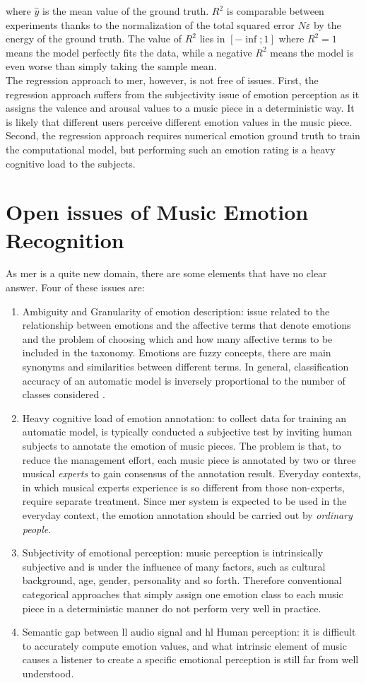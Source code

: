 where $\widehat{y}$ is the mean value of the ground truth. $R^2$ is comparable between experiments thanks to the normalization of the total squared error $N\varepsilon$ by the energy of the ground truth. The value of $R^2$  lies in $[-\inf;1]$ where $R^2=1$ means the model perfectly fits the data, while a negative $R^2$ means the model is even worse than simply taking the sample mean.
\\ \indent
The regression approach to \gls{mer}, however, is not free of issues. First, the regression approach suffers from the subjectivity issue of emotion perception as it assigns the valence and arousal values to a music piece in a deterministic way. It is likely that different users perceive different emotion values in the music piece. Second, the regression approach requires numerical emotion ground truth to train the computational model, but performing such an emotion rating is a heavy cognitive load to the subjects.

\newpage
\section{Open issues of Music Emotion Recognition} \label{issues}
As \gls{mer}  is a quite new domain, there are some elements that have no clear answer. Four of these issues are:
\begin{enumerate}
	\item Ambiguity and Granularity of emotion description: issue related to the relationship between emotions and the affective terms that denote emotions and the problem of choosing which and how many affective terms to be included in the taxonomy. Emotions are fuzzy concepts, there are main synonyms and similarities between different terms. In general, classification accuracy of an automatic model is inversely proportional to the number of classes considered \cite{van2006emotion}.
	\item Heavy cognitive load of emotion annotation: to collect data for training an automatic model, is typically conducted a subjective test by inviting human subjects to annotate the emotion of music pieces. The problem is that, to reduce the management effort, each music piece is annotated by two or three musical \textit{experts} to gain consensus of the annotation result. Everyday contexts, in which musical experts experience is so different from those non-experts, require separate treatment. Since \gls{mer} system is expected to be used in the everyday context, the emotion annotation should be carried out by \textit{ordinary people}.
	\item Subjectivity of emotional perception: music perception is intrinsically subjective and is under the influence of many factors, such as cultural background, age, gender, personality and so forth. Therefore conventional categorical approaches that simply assign one emotion class to each music piece in a deterministic manner do not perform very well in practice.
	\item Semantic gap between \gls{ll} audio signal and \gls{hl} Human perception: it is difficult to accurately compute emotion values, and what intrinsic element of music causes a listener to create a specific emotional perception is still far from well understood.
\end{enumerate}

